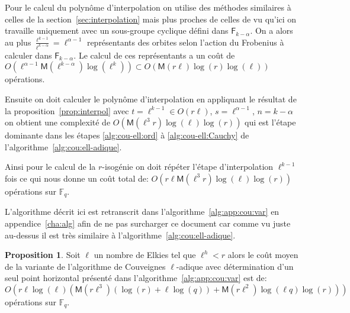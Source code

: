 \documentclass[10pt,a4paper]{book}
\theoremstyle{plain}
\theoremstyle{definition}
\theoremstyle{definition}
\theoremstyle{definition}
\newtheorem{prop}[thm]{Proposition}
\theoremstyle{definition}
\theoremstyle{remark}
\theoremstyle{remark}
\theoremstyle{definition}
\begin{document}
Pour le calcul du polynôme d'interpolation on utilise des méthodes 
similaires à celles de la section~\ref{sec:interpolation} mais plus proches de 
celles de \cite[§5]{DeFeo11} vu qu'ici on travaille uniquement avec un sous-groupe 
cyclique défini dans $\mathsf{F}_{k-\alpha}$. 
On a alors au plus $\frac{\ell^{k-1}}{\ell^{k-\alpha}}=\ell^{\alpha-1}$ représentants 
des orbites selon l'action du Frobenius à calculer dans $\mathsf{F}_{k-\alpha}$.
Le calcul de ces représentants a un coût de 
$O(\ell^{\alpha-1}\mathsf{M}(\ell^{k-\alpha})\log(\ell^k)) \subset O(\mathsf{M}(r\ell)\log(r)\log(\ell))$ opérations.

Ensuite on doit calculer le polynôme d'interpolation en appliquant le résultat
 de la proposition~\ref{prop:interpol} avec $t=\ell^{k-1} \in O(r \ell)$, $s=\ell^{\alpha-1}$, 
 $n=k-\alpha$ on obtient une complexité de 
 $O(\mathsf{M}(\ell^3r)\log(\ell)\log(r))$ qui est l'étape dominante dans les
 étapes \ref{alg:cou-ell:ord} à \ref{alg:cou-ell:Cauchy} de 
 l'algorithme~\ref{alg:cou:ell-adique}.

Ainsi pour le calcul de la $r$-isogénie on doit répéter l'étape d'interpolation 
$\ell^{k-1}$ fois ce qui nous donne un coût total de: 
$O(r \ell \mathsf{M}(\ell^3r)\log(\ell)\log(r))$ opérations sur $\mathbb{F}_q$.

L'algorithme décrit ici est retranscrit dans l'algorithme~\ref{alg:app:cou:var}
en appendice~\ref{cha:alg} afin de ne pas surcharger ce document car comme vu 
juste au-dessus il est très similaire à l'algorithme~\ref{alg:cou:ell-adique}.

\begin{prop}
Soit $\ell$ un nombre de Elkies tel que $\ell^h<r$ alors le coût moyen de la 
variante de l'algorithme de Couveignes $\ell$-adique avec détermination d'un 
seul point horizontal présenté dans l'algorithme~\ref{alg:app:cou:var} 
est de: 
\[
O(r \ell \log(\ell) ( \mathsf{M}(r \ell^3) (\log(r) + \ell \log(q)) + \mathsf{M}(r \ell^2) \log(\ell q) \log(r) ) )
\]
opérations sur $\mathbb{F}_q$.
\end{prop}
\end{document}
